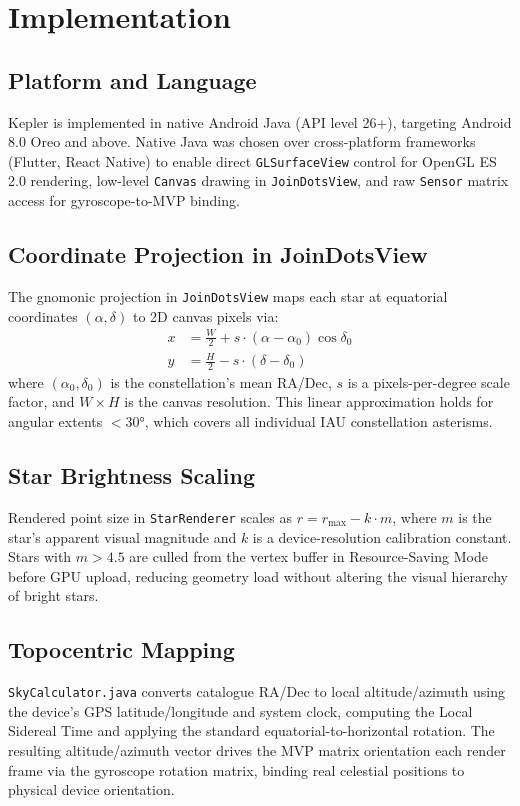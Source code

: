\documentclass[conference]{IEEEtran}
\begin{document}
\section{Implementation}
\label{sec:implementation}

\subsection{Platform and Language}
Kepler is implemented in native Android Java (API level 26+), targeting Android 8.0 Oreo and above. Native Java was chosen over cross-platform frameworks (Flutter, React Native) to enable direct \texttt{GLSurfaceView} control for OpenGL ES 2.0 rendering, low-level \texttt{Canvas} drawing in \texttt{JoinDotsView}, and raw \texttt{Sensor} matrix access for gyroscope-to-MVP binding.

\subsection{Coordinate Projection in JoinDotsView}
The gnomonic projection in \texttt{JoinDotsView} maps each star at equatorial coordinates $(\alpha, \delta)$ to 2D canvas pixels via:
\begin{align}
  x &= \tfrac{W}{2} + s \cdot (\alpha - \alpha_0)\cos\delta_0 \\
  y &= \tfrac{H}{2} - s \cdot (\delta - \delta_0)
\end{align}
where $(\alpha_0, \delta_0)$ is the constellation's mean RA/Dec, $s$ is a pixels-per-degree scale factor, and $W \times H$ is the canvas resolution. This linear approximation holds for angular extents $< 30°$, which covers all individual IAU constellation asterisms.

\subsection{Star Brightness Scaling}
Rendered point size in \texttt{StarRenderer} scales as $r = r_{\max} - k \cdot m$, where $m$ is the star's apparent visual magnitude and $k$ is a device-resolution calibration constant. Stars with $m > 4.5$ are culled from the vertex buffer in Resource-Saving Mode before GPU upload, reducing geometry load without altering the visual hierarchy of bright stars.

\subsection{Topocentric Mapping}
\texttt{SkyCalculator.java} converts catalogue RA/Dec to local altitude/azimuth using the device's GPS latitude/longitude and system clock, computing the Local Sidereal Time and applying the standard equatorial-to-horizontal rotation. The resulting altitude/azimuth vector drives the MVP matrix orientation each render frame via the gyroscope rotation matrix, binding real celestial positions to physical device orientation.
\end{document}
